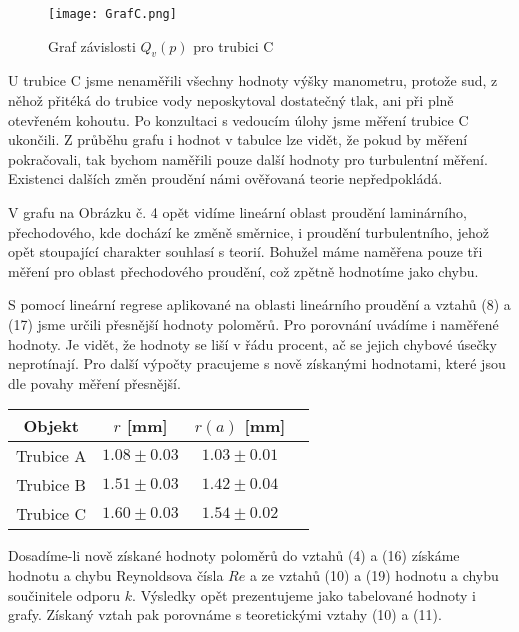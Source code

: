 \documentclass[a4paper]{article}
\begin{document}
\begin{figure}[H]
\centering
\texttt{[image: GrafC.png]}
\caption{Graf závislosti $Q_{v}(p)$ pro trubici C}
\end{figure}
\par U trubice C jsme nenaměřili všechny hodnoty výšky manometru, protože sud, z něhož přitéká do trubice vody neposkytoval dostatečný tlak, ani při plně otevřeném kohoutu. Po konzultaci s vedoucím úlohy jsme měření trubice C ukončili. Z průběhu grafu i hodnot v tabulce lze vidět, že pokud by měření pokračovali, tak bychom naměřili pouze další hodnoty pro turbulentní měření. Existenci dalších změn proudění námi ověřovaná teorie nepředpokládá.
\par V grafu na Obrázku č. 4 opět vidíme lineární oblast proudění laminárního, přechodového, kde dochází ke změně směrnice, i proudění turbulentního, jehož opět stoupající charakter souhlasí s teorií. Bohužel máme naměřena pouze tři měření pro oblast přechodového proudění, což zpětně hodnotíme jako chybu.
\par S pomocí lineární regrese aplikované na oblasti lineárního proudění a vztahů (8) a (17) jsme určili přesnější hodnoty poloměrů. Pro porovnání uvádíme i naměřené hodnoty. Je vidět, že hodnoty se liší v řádu procent, ač se jejich chybové úsečky neprotínají. Pro další výpočty pracujeme s nově získanými hodnotami, které jsou dle povahy měření přesnější.
\begin{center}
    \label{tab:title}
    \begin{tabular}{ | c | c | c |  p{3cm} |} \hline
    Objekt & $r$ [mm] & $r(a)$ [mm]   \\ \hline
    Trubice A & $1.08\pm0.03$ & $1.03\pm0.01$ \\ \hline
    Trubice B & $1.51\pm0.03$ & $1.42\pm0.04$ \\ \hline
    Trubice C & $1.60\pm0.03$ & $1.54\pm0.02$ \\ \hline
    \end{tabular}
\end{center}
\par Dosadíme-li nově získané hodnoty poloměrů do vztahů (4) a (16) získáme hodnotu a chybu Reynoldsova čísla $Re$ a ze vztahů (10) a (19) hodnotu a chybu součinitele odporu $k$. Výsledky opět prezentujeme jako tabelované hodnoty i grafy. Získaný vztah pak porovnáme s teoretickými vztahy (10) a (11).
\newpage
\end{document}
